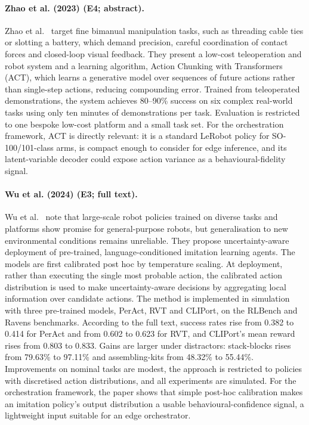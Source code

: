 \documentclass[10pt,a4paper]{article}
\begin{document}
\paragraph{Zhao et al. (2023) (E4; abstract).} Zhao et al.~\cite{Zhao2023} target fine bimanual manipulation tasks, such as threading cable ties or slotting a battery, which demand precision, careful coordination of contact forces and closed-loop visual feedback. They present a low-cost teleoperation and robot system and a learning algorithm, Action Chunking with Transformers (ACT), which learns a generative model over sequences of future actions rather than single-step actions, reducing compounding error. Trained from teleoperated demonstrations, the system achieves 80--90\% success on six complex real-world tasks using only ten minutes of demonstrations per task. Evaluation is restricted to one bespoke low-cost platform and a small task set. For the orchestration framework, ACT is directly relevant: it is a standard LeRobot policy for SO-100/101-class arms, is compact enough to consider for edge inference, and its latent-variable decoder could expose action variance as a behavioural-fidelity signal.

\paragraph{Wu et al. (2024) (E3; full text).} Wu et al.~\cite{Wu2024} note that large-scale robot policies trained on diverse tasks and platforms show promise for general-purpose robots, but generalisation to new environmental conditions remains unreliable. They propose uncertainty-aware deployment of pre-trained, language-conditioned imitation learning agents. The models are first calibrated post hoc by temperature scaling. At deployment, rather than executing the single most probable action, the calibrated action distribution is used to make uncertainty-aware decisions by aggregating local information over candidate actions. The method is implemented in simulation with three pre-trained models, PerAct, RVT and CLIPort, on the RLBench and Ravens benchmarks. According to the full text, success rates rise from 0.382 to 0.414 for PerAct and from 0.602 to 0.623 for RVT, and CLIPort's mean reward rises from 0.803 to 0.833. Gains are larger under distractors: stack-blocks rises from 79.63\% to 97.11\% and assembling-kits from 48.32\% to 55.44\%. Improvements on nominal tasks are modest, the approach is restricted to policies with discretised action distributions, and all experiments are simulated. For the orchestration framework, the paper shows that simple post-hoc calibration makes an imitation policy's output distribution a usable behavioural-confidence signal, a lightweight input suitable for an edge orchestrator.
\end{document}
